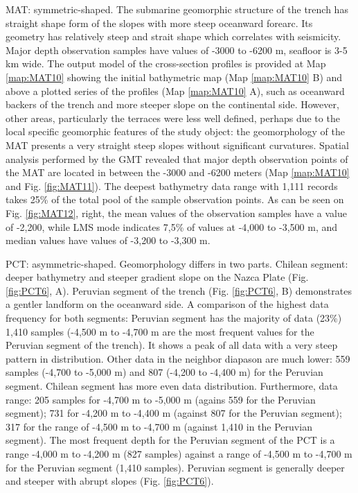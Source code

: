 \documentclass[11pt,a4paper]{report}
\begin{document}
{\ac{MAT}: symmetric-shaped. The submarine geomorphic structure of the trench has straight shape form of the slopes with more steep oceanward forearc. Its geometry has relatively steep and strait shape which correlates with seismicity. Major depth observation samples have values of -3000 to -6200 m, seafloor is 3-5 km wide. The output model of the cross-section profiles is provided at Map \ref{map:MAT10} showing the initial bathymetric map (Map \ref{map:MAT10} B) and above a plotted series of the profiles (Map \ref{map:MAT10} A), such as oceanward backers of the trench and more steeper slope on the continental side. However, other areas, particularly the terraces were less well defined, perhaps due to the local specific geomorphic features of the study object: the geomorphology of the \ac{MAT} presents a very straight steep slopes without significant curvatures. Spatial analysis performed by the GMT revealed that major depth observation points of the \ac{MAT} are located in between the -3000 and -6200 meters (Map \ref{map:MAT10} and Fig. \ref{fig:MAT11}). The deepest bathymetry data range with 1,111 records takes 25\% of the total pool of the sample observation points. As can be seen on Fig. \ref{fig:MAT12}, right, the mean values of the observation samples have a value of -2,200, while LMS mode indicates 7,5\% of values at -4,000 to -3,500 m, and median values have values of -3,200 to -3,300 m. 

\ac{PCT}: asymmetric-shaped. Geomorphology differs in two parts. Chilean segment: deeper bathymetry and steeper gradient slope on the Nazca Plate (Fig. \ref{fig:PCT6}, A). Peruvian segment of the trench (Fig. \ref{fig:PCT6}, B) demonstrates a gentler landform on the oceanward side. A comparison of the highest data frequency for both segments: Peruvian segment has the majority of data (23\%) 1,410 samples (-4,500 m to -4,700 m are the most frequent values for the Peruvian segment of the trench). It shows a peak of all data with a very steep pattern in distribution. Other data in the neighbor diapason are much lower: 559 samples (-4,700 to -5,000 m) and 807 (-4,200 to -4,400 m) for the Peruvian segment. Chilean segment has more even data distribution. Furthermore, data range: 205 samples for -4,700 m to -5,000 m (agains 559 for the Peruvian segment); 731 for -4,200 m to -4,400 m (against 807 for the Peruvian segment); 317 for the range of -4,500 m to -4,700 m (against 1,410 in the Peruvian segment). The most frequent depth for the Peruvian segment of the \ac{PCT} is a range -4,000 m to -4,200 m (827 samples) against a range of -4,500 m to -4,700 m for the Peruvian segment (1,410 samples). Peruvian segment  is generally deeper and steeper with abrupt slopes (Fig. \ref{fig:PCT6}).

}
\end{document}
